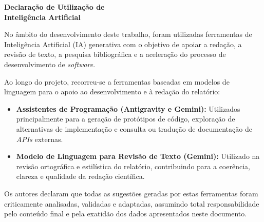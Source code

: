 
\vspace*{\fill} 

\begin{center}
    {\Huge \bfseries Declaração de Utilização de \\ Inteligência Artificial} \\[1cm]
\end{center}

No âmbito do desenvolvimento deste trabalho, foram utilizadas ferramentas de Inteligência Artificial (IA) generativa com o objetivo de apoiar a redação, a revisão de texto, a pesquisa bibliográfica e a aceleração do processo de desenvolvimento de \textit{software}.

Ao longo do projeto, recorreu-se a ferramentas baseadas em modelos de linguagem para o apoio ao desenvolvimento e à redação do relatório:
\begin{itemize}
    \item \textbf{Assistentes de Programação (Antigravity e Gemini):} Utilizados principalmente para a geração de protótipos de código, exploração de alternativas de implementação e consulta ou tradução de documentação de \textit{APIs} externas.
    \item \textbf{Modelo de Linguagem para Revisão de Texto (Gemini):} Utilizado na revisão ortográfica e estilística do relatório, contribuindo para a coerência, clareza e qualidade da redação científica.
\end{itemize}

Os autores declaram que todas as sugestões geradas por estas ferramentas foram criticamente analisadas, validadas e adaptadas, assumindo total responsabilidade pelo conteúdo final e pela exatidão dos dados apresentados neste documento.

\vspace*{\fill} 

\newpage